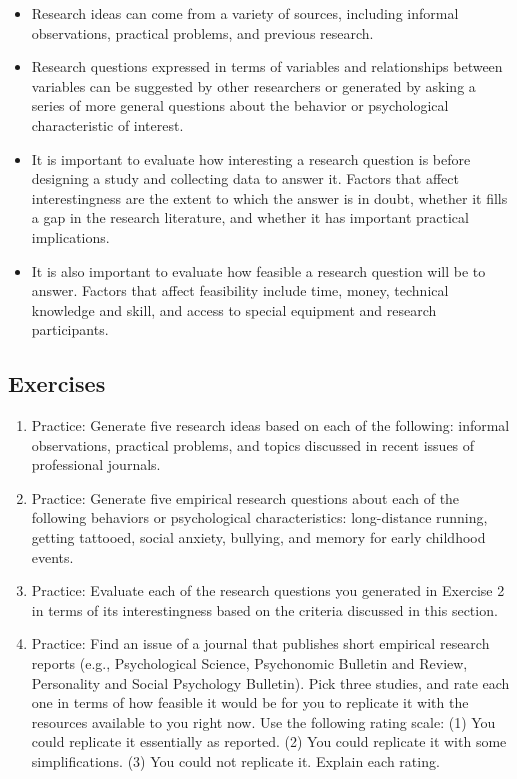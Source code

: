 \documentclass[]{book}
\theoremstyle{definition}
\theoremstyle{definition}
\theoremstyle{remark}
\begin{document}
\begin{itemize}
\item
  Research ideas can come from a variety of sources, including informal
  observations, practical problems, and previous research.
\item
  Research questions expressed in terms of variables and relationships
  between variables can be suggested by other researchers or generated
  by asking a series of more general questions about the behavior or
  psychological characteristic of interest.
\item
  It is important to evaluate how interesting a research question is
  before designing a study and collecting data to answer it. Factors
  that affect interestingness are the extent to which the answer is in
  doubt, whether it fills a gap in the research literature, and whether
  it has important practical implications.
\item
  It is also important to evaluate how feasible a research question will
  be to answer. Factors that affect feasibility include time, money,
  technical knowledge and skill, and access to special equipment and
  research participants.
\end{itemize}

\subsection{Exercises}\label{exercises-5}

\begin{enumerate}
\def\labelenumi{\arabic{enumi}.}
\item
  Practice: Generate five research ideas based on each of the following:
  informal observations, practical problems, and topics discussed in
  recent issues of professional journals.
\item
  Practice: Generate five empirical research questions about each of the
  following behaviors or psychological characteristics: long-distance
  running, getting tattooed, social anxiety, bullying, and memory for
  early childhood events.
\item
  Practice: Evaluate each of the research questions you generated in
  Exercise 2 in terms of its interestingness based on the criteria
  discussed in this section.
\item
  Practice: Find an issue of a journal that publishes short empirical
  research reports (e.g., Psychological Science, Psychonomic Bulletin
  and Review, Personality and Social Psychology Bulletin). Pick three
  studies, and rate each one in terms of how feasible it would be for
  you to replicate it with the resources available to you right now. Use
  the following rating scale: (1) You could replicate it essentially as
  reported. (2) You could replicate it with some simplifications. (3)
  You could not replicate it. Explain each rating.
\end{enumerate}
\end{document}

